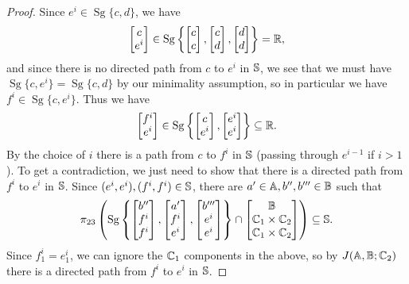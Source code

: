 \documentclass[letterpaper,11pt]{article}
\DeclareMathOperator{\Sg}{Sg}
\begin{document}
\begin{proof}
Since $e^i \in \Sg\{c,d\}$, we have
\[
\begin{bmatrix}c\\ e^i\end{bmatrix} \in \Sg\left\{\begin{bmatrix}c\\ c\end{bmatrix},\begin{bmatrix}c\\ d\end{bmatrix},\begin{bmatrix}d\\ d\end{bmatrix}\right\} = \RR,
\]
and since there is no directed path from $c$ to $e^i$ in $\mathbb{S}$, we see that we must have $\Sg\{c,e^i\} = \Sg\{c,d\}$ by our minimality assumption, so in particular we have $f^i \in \Sg\{c,e^i\}$. Thus we have
\[
\begin{bmatrix}f^i\\ e^i\end{bmatrix} \in \Sg\left\{\begin{bmatrix}c\\ e^i\end{bmatrix},\begin{bmatrix}e^i\\ e^i\end{bmatrix}\right\} \subseteq \RR.
\]
By the choice of $i$ there is a path from $c$ to $f^i$ in $\mathbb{S}$ (passing through $e^{i-1}$ if $i > 1$). To get a contradiction, we just need to show that there is a directed path from $f^i$ to $e^i$ in $\mathbb{S}$. Since $(e^i,e^i), (f^i,f^i) \in \mathbb{S}$, there are $a' \in \mathbb{A}, b'',b''' \in \mathbb{B}$ such that
\[
\pi_{23}\left(\Sg\left\{\begin{bmatrix}b''\\ f^i\\ f^i\end{bmatrix}, \begin{bmatrix} a'\\ f^i\\ e^i\end{bmatrix}, \begin{bmatrix}b'''\\ e^i\\ e^i\end{bmatrix}\right\}\cap \begin{bmatrix}\bB\\ \bC_1\times\bC_2\\ \bC_1\times\bC_2\end{bmatrix}\right) \subseteq \bS.
\]
Since $f^i_1 = e^i_1$, we can ignore the $\mathbb{C}_1$ components in the above, so by $J(\mathbb{A},\mathbb{B};\mathbb{C}_2)$ there is a directed path from $f^i$ to $e^i$ in $\mathbb{S}$.
\end{proof}
\end{document}

